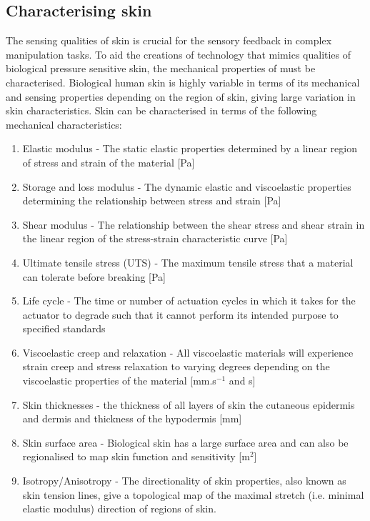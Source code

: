 \subsection{Characterising skin}
The sensing qualities of skin is crucial for the sensory feedback in complex manipulation tasks. To aid the creations of technology that mimics qualities of biological pressure sensitive skin, the mechanical properties of must be characterised. Biological human skin is highly variable in terms of its mechanical and sensing properties depending on the region of skin, giving large variation in skin characteristics. Skin can be characterised in terms of the following mechanical characteristics:
\begin{enumerate}
    \item Elastic modulus -  The static elastic properties determined by a linear region of stress and strain of the material [Pa]
    \item Storage and loss modulus - The dynamic elastic and viscoelastic properties determining the relationship between stress and strain [Pa]
    \item Shear modulus - The relationship between the shear stress and shear strain in the linear region of the stress-strain characteristic curve [Pa]
    \item Ultimate tensile stress (UTS) - The maximum tensile stress that a material can tolerate before breaking [Pa]
    \item Life cycle - The time or number of actuation cycles in which it takes for the actuator to degrade such that it cannot perform its intended purpose to specified standards
    \item Viscoelastic creep and relaxation - All viscoelastic materials will experience strain creep and stress relaxation to varying degrees depending on the viscoelastic properties of the material [mm.s$^{-1}$ and s]
    \item Skin thicknesses - the thickness of all layers of skin the cutaneous epidermis and dermis and thickness of the hypodermis [mm]
    \item Skin surface area - Biological skin has a large surface area and can also be regionalised to map skin function and sensitivity [m$^2$]
    \item Isotropy/Anisotropy - The directionality of skin properties, also known as skin tension lines, give a topological map of the maximal stretch (i.e. minimal elastic modulus) direction of regions of skin.
\end{enumerate}
